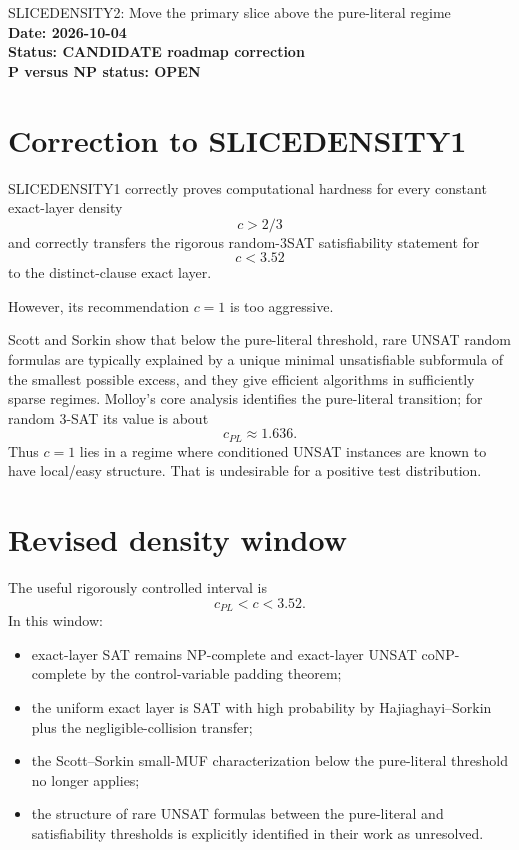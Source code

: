 \documentclass[11pt]{article}
\begin{document}
\begin{center}
{\Large SLICEDENSITY2: Move the primary slice above the pure-literal regime}\\[4pt]
\textbf{Date: 2026-10-04}\\
\textbf{Status: CANDIDATE roadmap correction}\\
\textbf{P versus NP status: OPEN}
\end{center}

\section{Correction to SLICEDENSITY1}

SLICEDENSITY1 correctly proves computational hardness for every constant exact-layer density
\[
c>2/3
\]
and correctly transfers the rigorous random-3SAT satisfiability statement for
\[
c<3.52
\]
to the distinct-clause exact layer.

However, its recommendation \(c=1\) is too aggressive.

Scott and Sorkin show that below the pure-literal threshold, rare UNSAT random formulas are typically explained by a unique minimal unsatisfiable subformula of the smallest possible excess, and they give efficient algorithms in sufficiently sparse regimes. Molloy's core analysis identifies the pure-literal transition; for random 3-SAT its value is about
\[
c_{PL}\approx1.636.
\]
Thus \(c=1\) lies in a regime where conditioned UNSAT instances are known to have local/easy structure. That is undesirable for a positive test distribution.

\section{Revised density window}

The useful rigorously controlled interval is
\[
\boxed{c_{PL}<c<3.52}.
\]
In this window:
\begin{itemize}
\item[] exact-layer SAT remains NP-complete and exact-layer UNSAT coNP-complete by the control-variable padding theorem;
\item[] the uniform exact layer is SAT with high probability by Hajiaghayi--Sorkin plus the negligible-collision transfer;
\item[] the Scott--Sorkin small-MUF characterization below the pure-literal threshold no longer applies;
\item[] the structure of rare UNSAT formulas between the pure-literal and satisfiability thresholds is explicitly identified in their work as unresolved.
\end{itemize}
\end{document}
